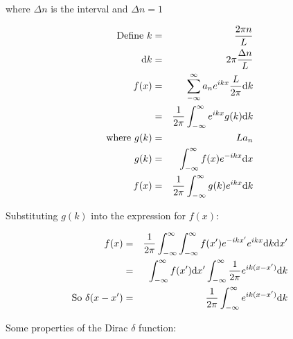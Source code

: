 where $\Delta n$ is the interval and $\Delta n = 1$

\begin{eqnarray*}
  \textrm{Define } k & = & \frac{2\pi n}{L} \\
  \mathrm{d}k & = & 2\pi \frac{\Delta n}{L} \\
  f(x) & = & \displaystyle\sum_{-\infty}^{\infty} a_n e^{ikx} \frac{L}{2\pi} \mathrm{d}k \\
  & = & \frac{1}{2\pi} \int_{-\infty}^{\infty}e^{ikx}g(k)\mathrm{d}k \\
  \textrm{where } g(k) & = & La_n \\
  g(k) & = & \int_{-\infty}^{\infty} f(x)e^{-ikx} \mathrm{d}x \\
  f(x) & = & \frac{1}{2 \pi}\int_{-\infty}^{\infty} g(k)e^{ikx}\mathrm{d}k
\end{eqnarray*}

Substituting $g(k)$ into the expression for $f(x)$:

\begin{eqnarray*}
  f(x) & = & \frac{1}{2 \pi} \int_{-\infty}^{\infty} \int_{-\infty}^{\infty}f(x')e^{-ikx'}e^{ikx}\mathrm{d}k\mathrm{d}x' \\
  & = & \int_{-\infty}^{\infty} f(x')\mathrm{d}x' \int_{-\infty}^{\infty} \frac{1}{2\pi} e^{ik(x-x')}\mathrm{d}k \\
  \textrm{So } \delta(x-x') & = & \frac{1}{2 \pi} \int_{-\infty}^{\infty}e^{ik(x-x')}\mathrm{d}k
\end{eqnarray*}

Some properties of the Dirac $\delta$ function: \nopagebreak

